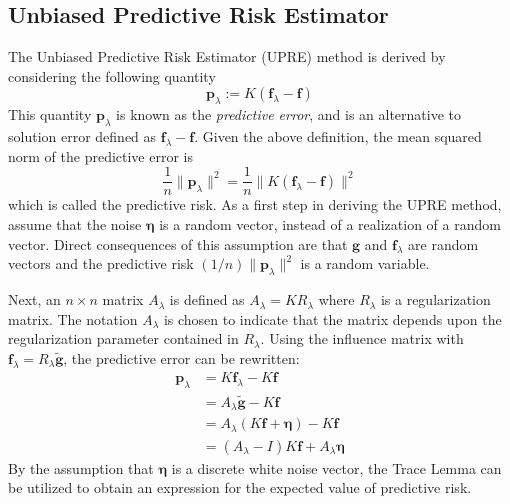 \documentclass[12pt]{article}
\newcommand{\gdis}{\mathbf{g}}
\newcommand{\gnoise}{\widetilde{\mathbf{g}}}
\newcommand{\kmat}{K}	%
\newcommand{\fdis}{\mathbf{f}}
\newcommand{\regparam}{\lambda}
\newcommand{\R}{R_{\regparam}}	%
\newcommand{\freg}{\fdis_{\regparam}}	%
\newcommand{\noise}{\bm{\eta}}	%
\newcommand{\PE}{\mathbf{p}_{\regparam}}	%
\newcommand{\A}{A_{\regparam}}	%
\begin{document}
\subsection{Unbiased Predictive Risk Estimator}
The Unbiased Predictive Risk Estimator (UPRE) method is derived by considering the following quantity
\[\PE := \kmat(\freg - \fdis)\]
This quantity $\PE$ is known as the \textit{predictive error}, and is an alternative to solution error defined as $\freg - \fdis$. Given the above definition, the mean squared norm of the predictive error is
\[\frac{1}{n}\|\PE\|^2 = \frac{1}{n}\|\kmat(\freg - \fdis)\|^2\]
which is called the predictive risk.  As a first step in deriving the UPRE method, assume that the noise $\noise$ is a random vector, instead of a realization of a random vector. Direct consequences of this assumption are that $\gdis$ and $\freg$ are random vectors and the predictive risk $(1/n)\|\PE\|^2$ is a random variable. \par
Next, an $n \times n$ matrix $\A$ is defined as $\A = \kmat\R$ where $\R$ is a regularization matrix. The notation $\A$ is chosen to indicate that the matrix depends upon the regularization parameter contained in $\R$. Using the influence matrix with $\freg = \R\gnoise$, the predictive error can be rewritten:
\begin{align*}
\PE &= \kmat\freg - \kmat\fdis \\
&= \A\gnoise - \kmat\fdis \\
&= \A(\kmat\fdis + \noise) - \kmat\fdis \\
&= (\A - I)\kmat\fdis + \A\noise
\end{align*}
By the assumption that $\noise$ is a discrete white noise vector, the Trace Lemma can be utilized to obtain an expression for the expected value of predictive risk.
\end{document}
